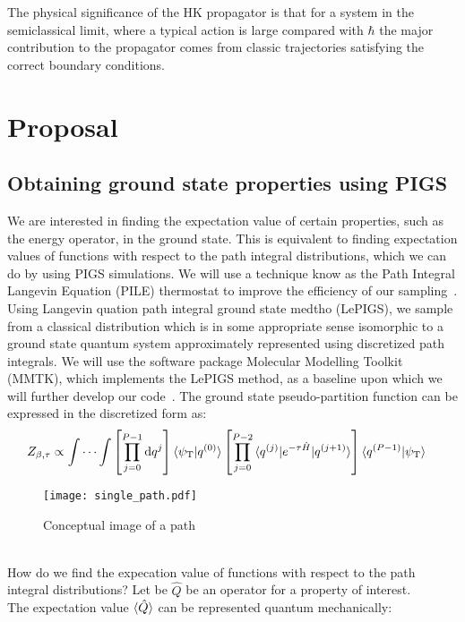 \documentclass[12pt,letterpaper,oneside,final,titlepage]{article}               %
\numberwithin{equation}{section} %
\newcommand{\psiT}{\psi_{\textrm{T}}}
\newcommand{\eTH}{e^{-\tau\hat{H}}}
\begin{document}
The physical significance of the HK propagator is that for a system in the semiclassical limit, where a typical action is large compared with $\hbar$ the major contribution to the propagator comes from classic trajectories satisfying the correct boundary conditions.




\section{Proposal}
\subsection{Obtaining ground state properties using PIGS}
We are interested in finding the expectation value of certain properties, such as the energy operator, in the ground state. 
This is equivalent to finding expectation values of functions with respect to the path integral distributions, which we can do by using PIGS simulations.
We will use a technique know as the Path Integral Langevin Equation (PILE) thermostat to improve the efficiency of our sampling~\cite{constable2013langevin}.
Using Langevin quation path integral ground state medtho (LePIGS), 
we sample from a classical distribution which is in some appropriate sense isomorphic to a ground state quantum system approximately represented
using discretized path integrals. 
We will use the software package Molecular Modelling Toolkit (MMTK), which implements the LePIGS method, as a baseline upon which we will further develop our code~\cite{hinsen2000molecular}. 
The ground state pseudo-partition function can be expressed in the discretized form as:
\begin{align*}
    Z_{\beta,\tau}
    &\propto \idotsint  \left[ \prod_{j=0}^{P-1} \dif q^{j}                      \right]
                        \braket{\psiT|q^{(0)}}
                        \left[ \prod_{j=0}^{P-2} \braket{q^{(j)}|\eTH|q^{(j+1)}} \right]
                        \braket{q^{(P-1)}|\psiT}
\end{align*}
\begin{figure}[h]
    \texttt{[image: single\_path.pdf]}
    \caption{Conceptual image of a path}
\end{figure} \\
How do we find the expecation value of functions with respect to the path integral distributions? 
Let be $\hat{Q}$ be an operator for a property of interest. \\
The expectation value $\braket{\hat{Q}}$ can be represented quantum mechanically:
\end{document}
